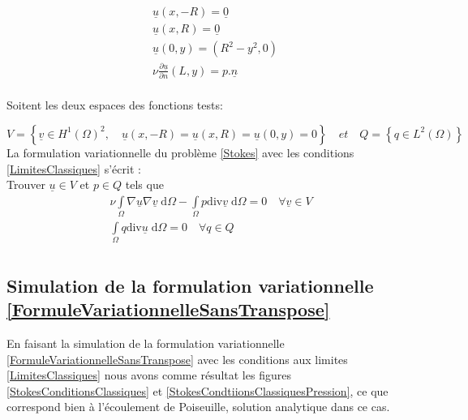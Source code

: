 \documentclass[11pt,a4paper]{article}
\numberwithin{equation}{subsection}
\numberwithin{figure}{subsection}
\begin{document}
\begin{equation}
\begin{aligned}
& \underline{u}(x,-R) = \underline{0} \\
& \underline{u}(x, R) = \underline{0} \\
& \underline{u}(0,y) = \left(R^2 - y^2, 0\right) \\
& \nu\frac{\partial\underline{u}}{\partial n}(L,y) = p.\underline{n}\\
\end{aligned} \label{LimitesClassiques}
\end{equation}

Soitent les deux espaces des fonctions tests:

$$V=\left\{\underline{v}\in H^1(\Omega)^2, \quad  \underline{u}(x,-R)=\underline{u}(x, R)=\underline{u}(0,y)=0\right\} \quad et \quad Q=\left\{q\in L^2(\Omega)\right\}$$
La formulation variationnelle du problème \ref{Stokes} avec les conditions \ref{LimitesClassiques} s’écrit :\\
Trouver $\underline{u}\in V $ et $p \in Q $ tels que\\

\begin{equation}
\begin{aligned}
\nu \int\limits_\Omega \nabla \underline{u} \nabla \underline{v} \;\mathrm{d}\Omega - \int\limits_\Omega p \mathrm{div}  \underline{v} \; \mathrm{d}\Omega = 0 \quad \forall \underline{v}\in V\\
\int\limits_\Omega q \mathrm{div} \underline{u} \;\mathrm{d}\Omega = 0 \quad \forall q \in Q\\
\end{aligned}\label{FormuleVariationnelleSansTranspose}
\end{equation}

\subsection{Simulation de la formulation variationnelle \ref{FormuleVariationnelleSansTranspose}}

En faisant la simulation de la formulation variationnelle \ref{FormuleVariationnelleSansTranspose} avec les conditions aux limites \ref{LimitesClassiques} nous avons comme résultat les figures \ref{StokesConditionsClassiques} et \ref{StokesCondtiionsClassiquesPression}, ce que correspond bien à l'écoulement de Poiseuille, solution analytique dans ce cas.
\end{document}
